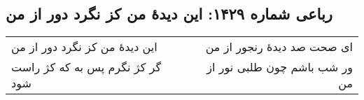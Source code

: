 \begin{center}
\section*{رباعی شماره ۱۴۲۹: این دیدهٔ من کز نگرد دور از من}
\label{sec:1429}
\begin{longtable}{l p{0.5cm} r}
این دیدهٔ من کز نگرد دور از من
&&
ای صحت صد دیدهٔ رنجور از من
\\
گر کژ نگرم پس به که کژ راست شود
&&
ور شب باشم چون طلبی نور از من
\\
\end{longtable}
\end{center}
